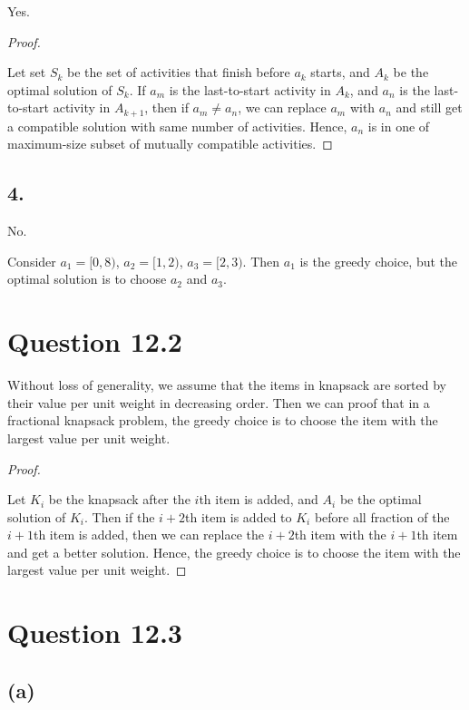 \documentclass[a4paper,12pt]{article}
\begin{document}
Yes.

\begin{proof}
$ $

Let set $S_k$ be the set of activities that finish before $a_k$ starts, and $A_k$ be the optimal solution of $S_k$.
If $a_m$ is the last-to-start activity in $A_k$, and $a_n$ is the last-to-start activity in $A_{k+1}$,
then if $a_m \neq a_n$, we can replace $a_m$ with $a_n$ and still get a compatible solution with same number of activities.
Hence, $a_n$ is in one of maximum-size subset of mutually compatible activities.
\end{proof}

\subsection*{4.}

No.

Consider $a_1 = [0,8)$, $a_2 = [1,2)$, $a_3 = [2,3)$.
Then $a_1$ is the greedy choice, but the optimal solution is to choose $a_2$ and $a_3$.

\section*{Question 12.2}

Without loss of generality, we assume that the items in knapsack are sorted by their value per unit weight in decreasing order.
Then we can proof that in a fractional knapsack problem, the greedy choice is to choose the item with the largest value per unit weight.

\begin{proof}
$ $

Let $K_i$ be the knapsack after the $i$th item is added, and $A_i$ be the optimal solution of $K_i$.
Then if the $i+2$th item is added to $K_i$ before all fraction of the $i+1$th item is added, then we can replace the $i+2$th item with the $i+1$th item and get a better solution.
Hence, the greedy choice is to choose the item with the largest value per unit weight.
\end{proof}

\section*{Question 12.3}

\subsection*{(a)}
\end{document}
